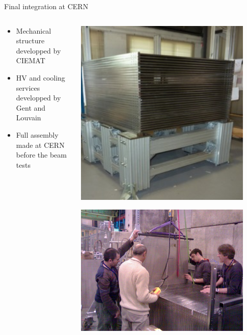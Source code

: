 \documentclass[10pt]{beamer}
\begin{document}
\begin{frame}{Final integration at CERN}
\begin{columns}
 \begin{column}{0.5\textwidth}
\begin{block}{}
  \begin{itemize}
  \item Mechanical structure developped by CIEMAT
  \item HV and cooling services developped by Gent and Louvain
  \item Full assembly made at CERN before the beam tests     
  \end{itemize}
\end{block}
      \end{column}
      
      \begin{column}{0.5\textwidth}
 
        \centerline{\includegraphics[width=0.9\textwidth,height=0.5\textheight]{jpg/ConstructionStructure.jpg}}
        \centerline{\includegraphics[width=0.9\textwidth]{jpg/ConstructionInsertion.jpg}}


\end{column}
\end{columns}
\end{frame}
\end{document}
